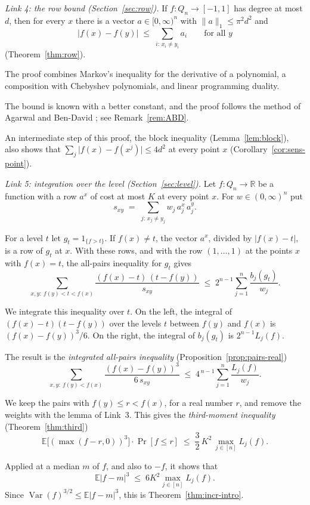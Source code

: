 \documentclass[11pt,reqno]{amsart}
\theoremstyle{definition}
\theoremstyle{remark}
\numberwithin{equation}{section}
\theoremstyle{named}
\theoremstyle{plain}
\newcommand{\R}{\mathbb{R}}
\newcommand{\E}{\mathbb{E}}
\newcommand{\Var}{\operatorname{Var}}
\newcommand{\norm}[1]{\lVert #1\rVert_1}
\newcommand{\abs}[1]{\lvert #1\rvert}
\begin{document}
\medskip\noindent\emph{Link 4: the row bound \textup{(Section~\ref{sec:row})}.}
If $f\colon Q_n\to[-1,1]$ has degree at most $d$, then for every $x$ there is a vector
$a\in[0,\infty)^{n}$ with $\norm{a}\le\pi^{2}d^{2}$ and
\[
   \abs{f(x)-f(y)}\;\le\;\sum_{i:\,x_i\ne y_i}a_i\qquad\text{for all }y
\]
(Theorem~\ref{thm:row}).

The proof combines
Markov's inequality for the derivative of a polynomial, a composition with Chebyshev polynomials, and
linear programming duality.

The bound is known with a better constant, and the proof follows the
method of Agarwal and Ben-David \cite{ABD}; see Remark~\ref{rem:ABD}.

An intermediate step of this proof, the block inequality (Lemma~\ref{lem:block}), also shows that
$\sum_j\abs{f(x)-f(x^{j})}\le4d^{2}$ at every point $x$ (Corollary~\ref{cor:sens-point}).

\medskip\noindent\emph{Link 5: integration over the level \textup{(Section~\ref{sec:level})}.}
Let $f\colon Q_n\to\R$ be a function with a row $a^{x}$ of cost at most $K$ at every point $x$.
For $w\in(0,\infty)^{n}$ put
\[
   s_{xy}\;=\;\sum_{j:\,x_j\ne y_j}w_j\,a^{x}_j\,a^{y}_j .
\]

For a level $t$ let $g_t=1_{\{f>t\}}$. If
$f(x)\ne t$, the vector $a^{x}$, divided by $\abs{f(x)-t}$, is a row of $g_t$ at $x$. With these
rows, and with the row $(1,\dots,1)$ at the points $x$ with $f(x)=t$, the all-pairs inequality for
$g_t$ gives
\[
   \sum_{x,y:\ f(y)<t<f(x)}\frac{(f(x)-t)\,(t-f(y))}{s_{xy}}
   \;\le\;2^{n-1}\sum_{j=1}^{n}\frac{b_j(g_t)}{w_j}.
\]

We integrate this inequality over $t$. On the left, the integral of $(f(x)-t)(t-f(y))$ over the
levels $t$ between $f(y)$ and $f(x)$ is $(f(x)-f(y))^{3}/6$. On the right, the integral of
$b_j(g_t)$ is $2^{n-1}L_j(f)$.

The result is the \emph{integrated all-pairs inequality}
(Proposition~\ref{prop:pairs-real})
\[
   \sum_{x,y:\ f(y)<f(x)}\frac{(f(x)-f(y))^{3}}{6\,s_{xy}}
   \;\le\;4^{\,n-1}\sum_{j=1}^{n}\frac{L_j(f)}{w_j}.
\]

We keep the pairs with $f(y)\le r<f(x)$, for a real number $r$, and remove the weights with the
lemma of Link~3. This gives the \emph{third-moment inequality} (Theorem~\ref{thm:third})
\[
   \E\bigl[(\max(f-r,0))^{3}\bigr]\cdot\Pr[f\le r]\;\le\;\frac32\,K^{2}\,\max_{j\in[n]}L_j(f).
\]

Applied at a median $m$ of $f$, and also to $-f$, it shows that
\[
   \E\abs{f-m}^{3}\;\le\;6K^{2}\max_{j\in[n]}L_j(f).
\]
Since $\Var(f)^{3/2}\le\E\abs{f-m}^{3}$, this is
Theorem~\ref{thm:incr-intro}.
\end{document}
